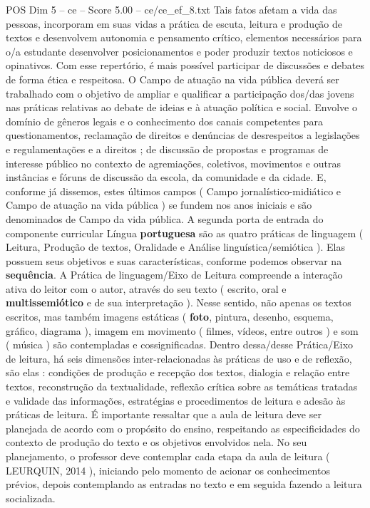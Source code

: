 \begin{textsample}{POS Dim 5 – ce – Score 5.00 – ce/ce\_ef\_8.txt}
Tais fatos afetam a vida das pessoas, incorporam em suas vidas a prática de escuta, leitura e produção de textos e desenvolvem autonomia e pensamento crítico, elementos necessários para o/a estudante desenvolver posicionamentos e poder produzir textos noticiosos e opinativos.
Com esse repertório, é mais possível participar de discussões e debates de forma ética e respeitosa.
O Campo de atuação na vida pública deverá ser trabalhado com o objetivo de ampliar e qualificar a participação dos/das jovens nas práticas relativas ao debate de ideias e à atuação política e social.
Envolve o domínio de gêneros legais e o conhecimento dos canais competentes para questionamentos, reclamação de direitos e denúncias de desrespeitos a legislações e regulamentações e a direitos ; de discussão de propostas e programas de interesse público no contexto de agremiações, coletivos, movimentos e outras instâncias e fóruns de discussão da escola, da comunidade e da cidade.
E, conforme já dissemos, estes últimos campos ( Campo jornalístico-midiático e Campo de atuação na vida pública ) se fundem nos anos iniciais e são denominados de Campo da vida pública.
A segunda porta de entrada do componente curricular Língua \textbf{portuguesa} são as quatro práticas de linguagem ( Leitura, Produção de textos, Oralidade e Análise linguística/semiótica ).
Elas possuem seus objetivos e suas características, conforme podemos observar na \textbf{sequência}.
A Prática de linguagem/Eixo de Leitura compreende a interação ativa do leitor com o autor, através do seu texto ( escrito, oral e \textbf{multissemiótico} e de sua interpretação ).
Nesse sentido, não apenas os textos escritos, mas também imagens estáticas ( \textbf{foto}, pintura, desenho, esquema, gráfico, diagrama ), imagem em movimento ( filmes, vídeos, entre outros ) e som ( música ) são contempladas e cossignificadas.
Dentro dessa/desse Prática/Eixo de leitura, há seis dimensões inter-relacionadas às práticas de uso e de reflexão, são elas : condições de produção e recepção dos textos, dialogia e relação entre textos, reconstrução da textualidade, reflexão crítica sobre as temáticas tratadas e validade das informações, estratégias e procedimentos de leitura e adesão às práticas de leitura.
É importante ressaltar que a aula de leitura deve ser planejada de acordo com o propósito do ensino, respeitando as especificidades do contexto de produção do texto e os objetivos envolvidos nela.
No seu planejamento, o professor deve contemplar cada etapa da aula de leitura ( LEURQUIN, 2014 ), iniciando pelo momento de acionar os conhecimentos prévios, depois contemplando as entradas no texto e em seguida fazendo a leitura socializada.

\end{textsample}
